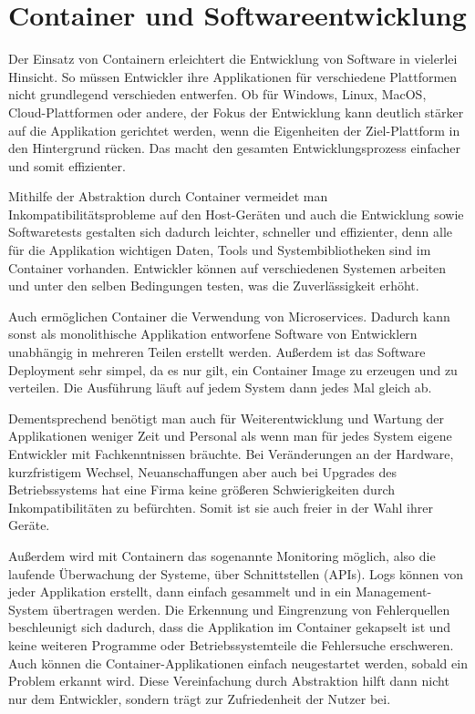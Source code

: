 \section{Container und Softwareentwicklung} 
\label{sec:Softwareentwicklung}
Der Einsatz von Containern erleichtert die Entwicklung von Software in vielerlei Hinsicht.
So müssen Entwickler ihre Applikationen für verschiedene Plattformen nicht grundlegend verschieden entwerfen.
Ob für Windows, Linux, MacOS, Cloud-Plattformen oder andere, der Fokus der Entwicklung kann deutlich stärker auf die Applikation gerichtet werden, wenn die Eigenheiten der Ziel-Plattform in den Hintergrund rücken. 
Das macht den gesamten Entwicklungsprozess einfacher und somit effizienter.

Mithilfe der Abstraktion durch Container vermeidet man Inkompatibilitätsprobleme auf den Host-Geräten und auch die Entwicklung sowie Softwaretests gestalten sich dadurch leichter, schneller und effizienter, denn alle für die Applikation wichtigen Daten, Tools und Systembibliotheken sind im Container vorhanden.
Entwickler können auf verschiedenen Systemen arbeiten und unter den selben Bedingungen testen, was die Zuverlässigkeit erhöht. 

Auch ermöglichen Container die Verwendung von Microservices.
Dadurch kann sonst als monolithische Applikation entworfene Software von Entwicklern unabhängig in mehreren Teilen erstellt werden.
Außerdem ist das Software Deployment sehr simpel, da es nur gilt, ein Container Image zu erzeugen und zu verteilen.
Die Ausführung läuft auf jedem System dann jedes Mal gleich ab.

Dementsprechend benötigt man auch für Weiterentwicklung und Wartung der Applikationen weniger Zeit und Personal als wenn man für jedes System eigene Entwickler mit Fachkenntnissen bräuchte.
Bei Veränderungen an der Hardware, kurzfristigem Wechsel, Neuanschaffungen aber auch bei Upgrades des Betriebssystems hat eine Firma keine größeren Schwierigkeiten durch Inkompatibilitäten zu befürchten. Somit ist sie auch freier in der Wahl ihrer Geräte.

Außerdem wird mit Containern das sogenannte Monitoring möglich, also die laufende Überwachung der Systeme, über Schnittstellen (APIs).
Logs können von jeder Applikation erstellt, dann einfach gesammelt und in ein Management-System übertragen werden.
Die Erkennung und Eingrenzung von Fehlerquellen beschleunigt sich dadurch, dass die Applikation im Container gekapselt ist und keine weiteren Programme oder Betriebssystemteile die Fehlersuche erschweren.
Auch können die Container-Applikationen einfach neugestartet werden, sobald ein Problem erkannt wird.
Diese Vereinfachung durch Abstraktion hilft dann nicht nur dem Entwickler, sondern trägt zur Zufriedenheit der Nutzer bei.
\cite{11517836120160501}

